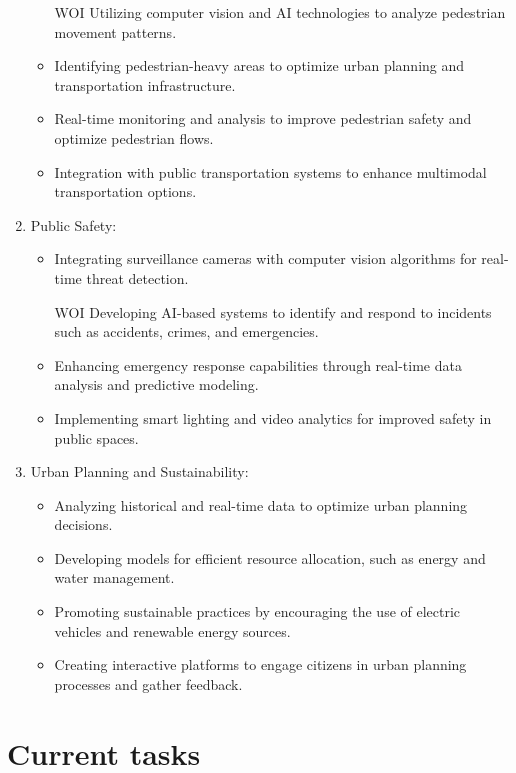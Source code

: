 \documentclass{intcov_report}
\begin{document}
\begin{enumerate}
   \begin{itemize}
   \item [WOI] Utilizing computer vision and AI technologies to analyze pedestrian movement patterns.
   \item Identifying pedestrian-heavy areas to optimize urban planning and transportation infrastructure.
   \item Real-time monitoring and analysis to improve pedestrian safety and optimize pedestrian flows.
   \item Integration with public transportation systems to enhance multimodal transportation options.
   \end{itemize}


\item Public Safety:

   \begin{itemize}
   \item Integrating surveillance cameras with computer vision algorithms for real-time threat detection.
   \item [WOI] Developing AI-based systems to identify and respond to incidents such as accidents, crimes, and emergencies.
   \item Enhancing emergency response capabilities through real-time data analysis and predictive modeling.
   \item Implementing smart lighting and video analytics for improved safety in public spaces.
   \end{itemize}

\item Urban Planning and Sustainability:

   \begin{itemize}
   \item Analyzing historical and real-time data to optimize urban planning decisions.
   \item Developing models for efficient resource allocation, such as energy and water management.
   \item Promoting sustainable practices by encouraging the use of electric vehicles and renewable energy sources.
   \item Creating interactive platforms to engage citizens in urban planning processes and gather feedback.
   \end{itemize}

\end{enumerate}


 
\section{Current tasks}
\end{document}
